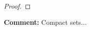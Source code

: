 \documentclass{article}
\newenvironment{comment}
  {\par\medskip
   \color{red}%
   \begin{framed}
   \textbf{Comment: }\ignorespaces}
 {\end{framed}
  \medskip}
\theoremstyle{case}
\numberwithin{theorem}{subsection}
\begin{document}
\begin{proof}
% 
% 

% 
% 

\end{proof}



\begin{comment}
Compact sets...
\end{comment}
\end{document}
